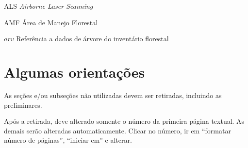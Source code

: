 \documentclass[
	12pt,				%
	openright,			%
	twoside,			%
	a4paper,			%
	chapter=TITLE,		%
	sumario=abnt-6027-2012,
	english,			%
	brazil				%
	]{UFVJM-abntex2}
\newcommand{\li}{\textit{LiDAR }}
\begin{document}
\listoftables*
\cleardoublepage

\begin{siglas}
\label{Siglas}
\item[ALS] \textit{Airborne Laser Scanning}
\item[AMF] Área de Manejo Florestal 
\item[$arv$] Referência a dados de árvore do inventário florestal

\end{siglas}



\tableofcontents
\cleardoublepage



\textual

\chapter{Algumas orientações}


As seções e/ou subseções não utilizadas devem ser retiradas, incluindo as preliminares.

Após a retirada, deve alterado somente o número da primeira página textual. As demais serão alteradas automaticamente. Clicar no número, ir em “formatar número de páginas”, “iniciar em” e alterar.
\end{document}
